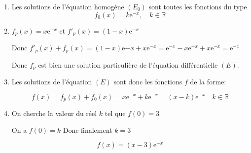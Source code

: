 \documentclass[a4paper,12pt]{article}
\newcommand{\R}{\mathds {R}}
\newcommand{\e}{\mathrm {e}}
\begin{document}
\begin{enumerate}
	\item Les solutions de l'équation homogène $(E_0)$ sont toutes les fonctions du type $$f_0(x)=k\e^{-x}, \quad k \in \R$$

\bigskip


	\item $f_p(x)=x\e^{-x}$ et $f'_p(x)=(1-x)\e^{-x}$
	
	Donc $f'_p(x)+f_p(x)=(1-x)\e{-x}+x\e^{-x}=\e^{-x}-x\e^{-x}+x\e^{-x}=\e^{-x}$
	
	Donc $f_p$ est bien une solution particulière de l'équation différentielle $(E)$.
	
	\bigskip
	
	
	
	\item Les solutions de l'équation $(E)$ sont donc les fonctions $f$ de la forme:
	
	$$f(x)=f_p(x)+f_0(x)=x\e^{-x}+k\e^{-x}=(x-k)\e^{-x} \quad k\in\R$$
	
	\bigskip
	
	\item On cherche la valeur du réel $k$ tel que $f(0)=3$
	
	On a $f(0)=k$ Donc finalement $k=3$
	
	$$f(x)=(x-3)\e^{-x}$$
\end{enumerate}
\end{document}
